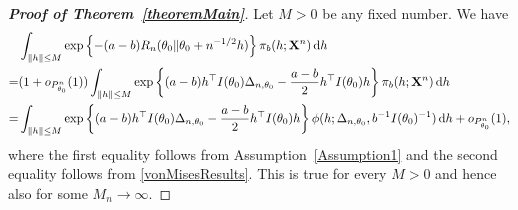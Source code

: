 \documentclass[11pt]{article}
\theoremstyle{plain}
\theoremstyle{definition}
\theoremstyle{remark}
\begin{document}
\begin{appendices}
\begin{proof}[\textbf{Proof of Theorem~\ref{theoremMain}}]
    Let $M>0$ be any fixed number.
    We have
\begin{equation}\label{eq:8}
    \begin{split}
    &\int_{\|h\|\leq M} 
    \exp\left\{ - (a-b) R_n ( \theta_0 \| \theta_0 + n^{-1/2} h ) \right\}
    \pi_b (h;\mathbf{X}^{n}) \, \mathrm dh\\
    =&
    ( 1 + o_{P^n_{\theta_0}}(1) )\int_{\|h\|\leq M} \exp\left\{ (a-b) h^\top  I(\theta_0)\Delta_{n,\theta_0}- \frac{a-b}{2}h^\top  I(\theta_0) h \right\}\pi_b (h;\mathbf{X}^{n}) \, \mathrm dh
    \\
    =&\int_{\|h\|\leq M} \exp \left\{ (a-b) h^\top  I(\theta_0)\Delta_{n,\theta_0}-\frac{a-b}{2}h^\top  I(\theta_0) h \right\} \phi(h;\Delta_{n,\theta_0}, b^{-1} I(\theta_0)^{-1})\, \mathrm dh
    +o_{P^n_{\theta_0}}(1),
\end{split}
\end{equation}
where the first equality follows from Assumption~\ref{Assumption1} and the second equality follows from \eqref{vonMisesResults}.
This is true for every $M>0$ and hence also for some $M_n\to \infty$.


\end{proof}
\end{appendices}
\end{document}
